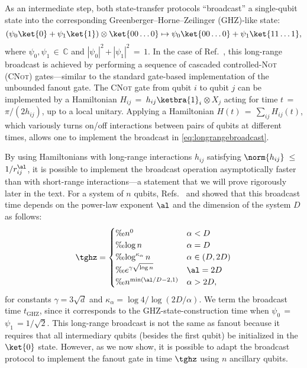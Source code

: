 As an intermediate step, both state-transfer protocols ``broadcast'' a single-qubit state into the corresponding Greenberger–Horne–Zeilinger (GHZ)-like state:
\begin{equation}
    \label{eq:longrangebroadcast}
	(\psi_0 \ket{0} + \psi_1 \ket{1})\otimes \ket{0 0 \dots 0} \mapsto \psi_0 \ket{0 0  \dots 0} + \psi_1 \ket{1 1 \dots 1},
\end{equation}
where $\psi_0, \psi_1$\,$\in$\,$\mathbb{C}$ and $|\psi_0|^2$\,$+$\,$|\psi_1|^2$\,$=$\,$1$.
In the case of Ref.~\cite{Eldredge2017}, this long-range broadcast is achieved by performing a sequence of cascaded controlled-\textsc{Not} (\textsc{CNot}) gates---similar to the standard gate-based implementation of the unbounded fanout gate.
The \textsc{CNot} gate from qubit $i$ to qubit $j$ can be implemented by a Hamiltonian $H_{ij}$\,$=$\,$h_{ij} \ketbra{1}_i$\,$\otimes$\,$X_j$ acting for time $t$\,$=$\,$\pi/(2h_{ij})$, up to a local unitary.
Applying a Hamiltonian $H(t)$\,$=$\,$\sum_{ij} H_{ij}(t)$, which variously turns on/off interactions between pairs of qubits at different times, allows one to implement the broadcast in \cref{eq:longrangebroadcast}.

By using Hamiltonians with long-range interactions $h_{ij}$ satisfying $\norm{h_{ij}}$\,$\le$\,$1/r_{ij}^\al$, it is possible to implement the broadcast operation asymptotically faster than with short-range interactions---a statement that we will prove rigorously later in the text.
For a system of $n$ qubits, Refs.~\cite{Eldredge2017} and \cite{Tran2021a} showed that this broadcast time depends on the power-law exponent $\al$ and the dimension of the system $D$ as follows:
\begin{equation}
\label{eq:statetransfertimes_new}
	\tghz =
  \begin{cases}
    \O{n^0} & \alpha < D
    \\ \O{\log n} & \alpha = D
    \\ \O{\log^{\kappa_\alpha} n }& \alpha \in (D,2D)
    \\ \O{e^{\gamma\sqrt{\log n}}}& \al = 2D
    \\ \O{n^{\min(\al/D - 2,1)}} & \alpha > 2D,
  \end{cases}
\end{equation}
for constants $\gamma = 3\sqrt{d}$ and $\kappa_\alpha = \log 4/\log(2D/\alpha)$.
We term the broadcast time $t_{\text{GHZ}}$, since it corresponds to the GHZ-state-construction time when $\psi_0$\,$=$\,$\psi_1$\,$=1/\sqrt{2}$.
This long-range broadcast is not the same as fanout because it requires that all intermediary qubits (besides the first qubit) be initialized in the $\ket{0}$ state.
However, as we now show, it is possible to adapt the broadcast protocol to implement the fanout gate in time $\tghz$ using $n$ ancillary qubits.

